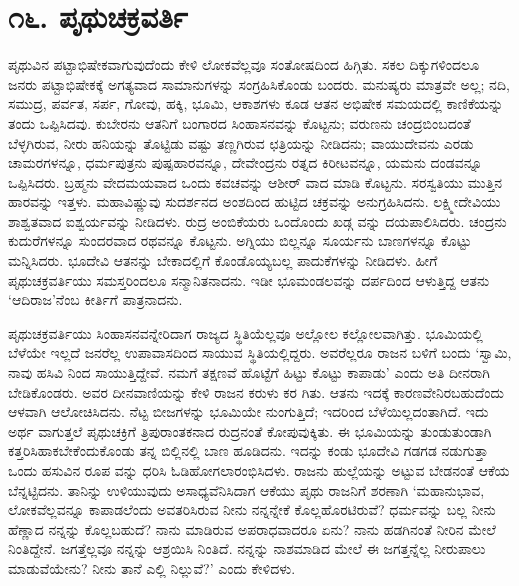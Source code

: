 
\chapter{೧೬. ಪೃಥುಚಕ್ರವರ್ತಿ}

ಪೃಥುವಿನ ಪಟ್ಟಾಭಿಷೇಕವಾಗುವುದೆಂದು ಕೇಳಿ ಲೋಕವೆಲ್ಲವೂ ಸಂತೋಷದಿಂದ ಹಿಗ್ಗಿತು. ಸಕಲ ದಿಕ್ಕುಗಳಿಂದಲೂ ಜನರು ಪಟ್ಟಾಭಿಷೇಕಕ್ಕೆ ಅಗತ್ಯವಾದ ಸಾಮಾನುಗಳನ್ನು ಸಂಗ್ರಹಿಸಿಕೊಂಡು ಬಂದರು. ಮನುಷ್ಯರು ಮಾತ್ರವೇ ಅಲ್ಲ; ನದಿ, ಸಮುದ್ರ, ಪರ್ವತ, ಸರ್ಪ, ಗೋವು, ಹಕ್ಕಿ, ಭೂಮಿ, ಆಕಾಶಗಳು ಕೂಡ ಆತನ ಅಭಿಷೇಕ ಸಮಯದಲ್ಲಿ ಕಾಣಿಕೆಯನ್ನು ತಂದು ಒಪ್ಪಿಸಿದವು. ಕುಬೇರನು ಆತನಿಗೆ ಬಂಗಾರದ ಸಿಂಹಾಸನವನ್ನು ಕೊಟ್ಟನು; ವರುಣನು ಚಂದ್ರಬಿಂಬದಂತೆ ಬೆಳ್ಳಗಿರುವ, ನೀರು ಹನಿಯನ್ನು ತೊಟ್ಟಿಡು ವಷ್ಟು ತಣ್ಣಗಿರುವ ಛತ್ರಿಯನ್ನು ನೀಡಿದನು; ವಾಯುದೇವನು ಎರಡು ಚಾಮರಗಳನ್ನೂ, ಧರ್ಮಪುತ್ರನು ಪುಷ್ಪಹಾರವನ್ನೂ, ದೇವೇಂದ್ರನು ರತ್ನದ ಕಿರೀಟವನ್ನೂ, ಯಮನು ದಂಡವನ್ನೂ ಒಪ್ಪಿಸಿದರು. ಬ್ರಹ್ಮನು ವೇದಮಯವಾದ ಒಂದು ಕವಚವನ್ನು ಆಶೀರ್ ವಾದ ಮಾಡಿ ಕೊಟ್ಟನು. ಸರಸ್ವತಿಯು ಮುತ್ತಿನ ಹಾರವನ್ನು ಇತ್ತಳು. ಮಹಾವಿಷ್ಣುವು ಸುದರ್ಶನದ ಅಂಶದಿಂದ ಹುಟ್ಟಿದ ಚಕ್ರವನ್ನು ಅನುಗ್ರಹಿಸಿದನು. ಲಕ್ಷ್ಮೀದೇವಿಯು ಶಾಶ್ವತವಾದ ಐಶ್ವರ್ಯವನ್ನು ನೀಡಿದಳು. ರುದ್ರ ಅಂಬಿಕೆಯರು ಒಂದೊಂದು ಖಡ್ಗ ವನ್ನು ದಯಪಾಲಿಸಿದರು. ಚಂದ್ರನು ಕುದುರೆಗಳನ್ನೂ ಸುಂದರವಾದ ರಥವನ್ನೂ ಕೊಟ್ಟನು. ಅಗ್ನಿಯು ಬಿಲ್ಲನ್ನೂ ಸೂರ್ಯನು ಬಾಣಗಳನ್ನೂ ಕೊಟ್ಟು ಮನ್ನಿಸಿದರು. ಭೂದೇವಿ ಆತನನ್ನು ಬೇಕಾದಲ್ಲಿಗೆ ಕೊಂಡೊಯ್ಯಬಲ್ಲ ಪಾದುಕೆಗಳನ್ನು ನೀಡಿದಳು. ಹೀಗೆ ಪೃಥುಚಕ್ರವರ್ತಿಯು ಸಮಸ್ತರಿಂದಲೂ ಸನ್ಮಾನಿತನಾದನು. ಇಡೀ ಭೂಮಂಡಲವನ್ನು ದರ್ಪದಿಂದ ಆಳುತ್ತಿದ್ದ ಆತನು ‘ಆದಿರಾಜ’ನೆಂಬ ಕೀರ್ತಿಗೆ ಪಾತ್ರನಾದನು.

ಪೃಥುಚಕ್ರವರ್ತಿಯು ಸಿಂಹಾಸನವನ್ನೇರಿದಾಗ ರಾಜ್ಯದ ಸ್ಥಿತಿಯೆಲ್ಲವೂ ಅಲ್ಲೋಲ ಕಲ್ಲೋಲವಾಗಿತ್ತು. ಭೂಮಿಯಲ್ಲಿ ಬೆಳೆಯೇ ಇಲ್ಲದೆ ಜನರೆಲ್ಲ ಉಪಾವಾಸದಿಂದ ಸಾಯುವ ಸ್ಥಿತಿಯಲ್ಲಿದ್ದರು. ಅವರೆಲ್ಲರೂ ರಾಜನ ಬಳಿಗೆ ಬಂದು ‘ಸ್ವಾಮಿ, ನಾವು ಹಸಿವಿ ನಿಂದ ಸಾಯುತ್ತಿದ್ದೇವೆ. ನಮಗೆ ತಕ್ಷಣವೆ ಹೊಟ್ಟೆಗೆ ಹಿಟ್ಟು ಕೊಟ್ಟು ಕಾಪಾಡು’ ಎಂದು ಅತಿ ದೀನರಾಗಿ ಬೇಡಿಕೊಂಡರು. ಅವರ ದೀನವಾಣಿಯನ್ನು ಕೇಳಿ ರಾಜನ ಕರುಳು ಕರ ಗಿತು. ಆತನು ಇದಕ್ಕೆ ಕಾರಣವೇನಿರಬಹುದೆಂದು ಆಳವಾಗಿ ಆಲೋಚಿಸಿದನು. ನೆಟ್ಟ ಬೀಜಗಳನ್ನು ಭೂಮಿಯೇ ನುಂಗುತ್ತಿದೆ; ಇದರಿಂದ ಬೆಳೆಯಿಲ್ಲದಂತಾಗಿದೆ. ಇದು ಅರ್ಥ ವಾಗುತ್ತಲೆ ಪೃಥುಚಕ್ರಿಗೆ ತ್ರಿಪುರಾಂತಕನಾದ ರುದ್ರನಂತೆ ಕೋಪುವುಕ್ಕಿತು. ಈ ಭೂಮಿಯನ್ನು ತುಂಡುತುಂಡಾಗಿ ಕತ್ತರಿಸಿಹಾಕಬೇಕೆಂದುಕೊಂಡು ತನ್ನ ಬಿಲ್ಲಿನಲ್ಲಿ ಬಾಣ ಹೂಡಿದನು. ಇದನ್ನು ಕಂಡು ಭೂದೇವಿ ಗಡಗಡ ನಡುಗುತ್ತಾ ಒಂದು ಹಸುವಿನ ರೂಪ ವನ್ನು ಧರಿಸಿ ಓಡಿಹೋಗಲಾರಂಭಿಸಿದಳು. ರಾಜನು ಹುಲ್ಲೆಯನ್ನು ಅಟ್ಟುವ ಬೇಡನಂತೆ ಆಕೆಯ ಬೆನ್ನಟ್ಟಿದನು. ತಾನಿನ್ನು ಉಳಿಯುವುದು ಅಸಾಧ್ಯವೆನಿಸಿದಾಗ ಆಕೆಯು ಪೃಥು ರಾಜನಿಗೆ ಶರಣಾಗಿ ‘ಮಹಾನುಭಾವ, ಲೋಕವೆಲ್ಲವನ್ನೂ ಕಾಪಾಡಲೆಂದು ಅವತರಿಸಿರುವ ನೀನು ನನ್ನನ್ನೇಕೆ ಕೊಲ್ಲಹೊರಟಿರುವೆ? ಧರ್ಮವನ್ನು ಬಲ್ಲ ನೀನು ಹೆಣ್ಣಾದ ನನ್ನನ್ನು ಕೊಲ್ಲಬಹುದೆ? ನಾನು ಮಾಡಿರುವ ಅಪರಾಧವಾದರೂ ಏನು? ನಾನು ಹಡಗಿನಂತೆ ನೀರಿನ ಮೇಲೆ ನಿಂತಿದ್ದೇನೆ. ಜಗತ್ತೆಲ್ಲವೂ ನನ್ನನ್ನು ಆಶ್ರಯಿಸಿ ನಿಂತಿದೆ. ನನ್ನನ್ನು ನಾಶಮಾಡಿದ ಮೇಲೆ ಈ ಜಗತ್ತನ್ನೆಲ್ಲ ನೀರುಪಾಲು ಮಾಡುವೆಯೇನು? ನೀನು ತಾನೆ ಎಲ್ಲಿ ನಿಲ್ಲುವೆ?’ ಎಂದು ಕೇಳಿದಳು.


